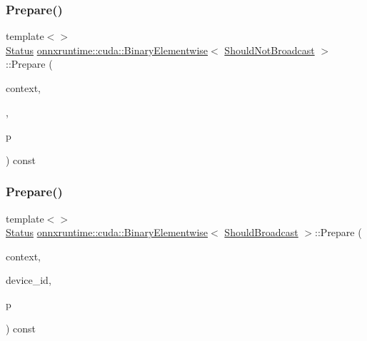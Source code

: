 \subsubsection{\texorpdfstring{Prepare()}{Prepare()}\hspace{0.1cm}{\footnotesize\ttfamily [1/3]}}
{\footnotesize\ttfamily template$<$$>$ \\
\mbox{\hyperlink{classonnxruntime_1_1common_1_1Status}{Status}} \mbox{\hyperlink{classonnxruntime_1_1cuda_1_1BinaryElementwise}{onnxruntime\+::cuda\+::\+Binary\+Elementwise}}$<$ \mbox{\hyperlink{classonnxruntime_1_1cuda_1_1ShouldNotBroadcast}{Should\+Not\+Broadcast}} $>$\+::Prepare (\begin{DoxyParamCaption}\item[{\mbox{\hyperlink{classonnxruntime_1_1OpKernelContext}{Op\+Kernel\+Context}} $\ast$}]{context,  }\item[{int}]{,  }\item[{\mbox{\hyperlink{structonnxruntime_1_1cuda_1_1BinaryElementwisePreparation}{Binary\+Elementwise\+Preparation}} $\ast$}]{p }\end{DoxyParamCaption}) const\hspace{0.3cm}{\ttfamily [protected]}}

\mbox{\label{classonnxruntime_1_1cuda_1_1BinaryElementwise_ab158e192cd4f7e19992ecbd21be5ecad}} 
\subsubsection{\texorpdfstring{Prepare()}{Prepare()}\hspace{0.1cm}{\footnotesize\ttfamily [2/3]}}
{\footnotesize\ttfamily template$<$$>$ \\
\mbox{\hyperlink{classonnxruntime_1_1common_1_1Status}{Status}} \mbox{\hyperlink{classonnxruntime_1_1cuda_1_1BinaryElementwise}{onnxruntime\+::cuda\+::\+Binary\+Elementwise}}$<$ \mbox{\hyperlink{classonnxruntime_1_1cuda_1_1ShouldBroadcast}{Should\+Broadcast}} $>$\+::Prepare (\begin{DoxyParamCaption}\item[{\mbox{\hyperlink{classonnxruntime_1_1OpKernelContext}{Op\+Kernel\+Context}} $\ast$}]{context,  }\item[{int}]{device\+\_\+id,  }\item[{\mbox{\hyperlink{structonnxruntime_1_1cuda_1_1BinaryElementwisePreparation}{Binary\+Elementwise\+Preparation}} $\ast$}]{p }\end{DoxyParamCaption}) const\hspace{0.3cm}{\ttfamily [protected]}}

